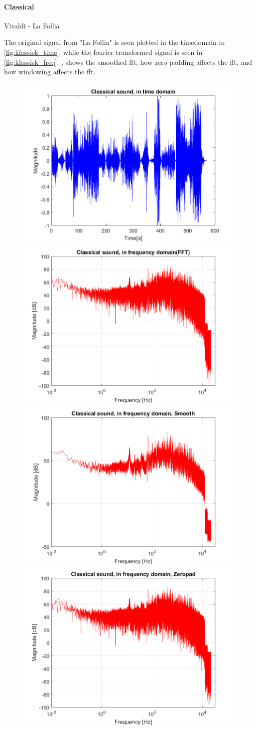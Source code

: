 \paragraph{Classical}
Vivaldi - La Follia

The original signal from "La Follia" is seen plotted in the timedomain in \cref{fig:klassisk_time}, while the fourier transformed signal is seen in \cref{fig:klassisk_freq}. , shows the smoothed fft, how zero padding affects the fft, and how windowing affects the fft.

\begin{figure}[htb!]
	\centering
	{\includegraphics[width=0.45\linewidth]{code/Classical_figure1.png}}
	{\includegraphics[width=0.45\linewidth]{code/Classical_figure2.png}}
	{\includegraphics[width=0.45\linewidth]{code/Classical_figure3.png}}
	{\includegraphics[width=0.45\linewidth]{code/Classical_figure4.png}}

\end{figure}
